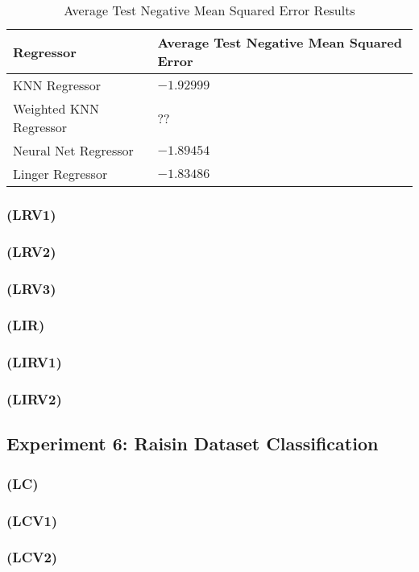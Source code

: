\documentclass[a4paper, 12pt]{report}
\begin{document}
\begin{table}[H]
    \centering
    \caption{Average Test Negative Mean Squared Error Results}
    \label{tab:average_results_test_Abalone}
    \begin{tabular}{|l|l|}
    \hline
    \textbf{Regressor} & \textbf{Average Test Negative Mean Squared Error} \\ \hline
    KNN Regressor & $-1.92999$ \\ \hline
    Weighted KNN Regressor & ?? \\ \hline
    Neural Net Regressor & $-1.89454$ \\ \hline
    Linger Regressor & $-1.83486$ \\ \hline
    \end{tabular}
\end{table}

\subsubsection{(LRV1)}
\subsubsection{(LRV2)}
\subsubsection{(LRV3)}
\subsubsection{(LIR)}
\subsubsection{(LIRV1)}
\subsubsection{(LIRV2)}

\subsection{Experiment 6: Raisin Dataset Classification}
\subsubsection{(LC)}
\subsubsection{(LCV1)}
\subsubsection{(LCV2)}
\end{document}

